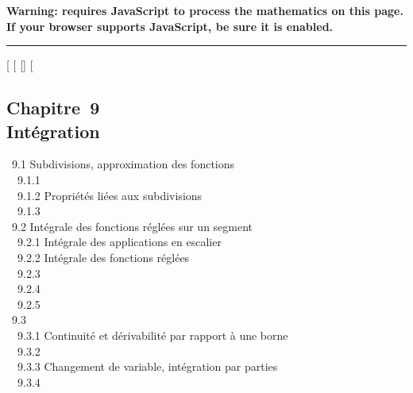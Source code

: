\textbf{Warning: 
requires JavaScript to process the mathematics on this page.\\ If your
browser supports JavaScript, be sure it is enabled.}

\begin{center}\rule{3in}{0.4pt}\end{center}

{[}
{[}
{[}{]}
{[}

\subsection{Chapitre~9\\Intégration}

~9.1 {Subdivisions, approximation
des fonctions} \\ ~~9.1.1
 \\
~~9.1.2 {Propriétés liées aux
subdivisions} \\ ~~9.1.3
 \\
~9.2 {Intégrale des fonctions
réglées sur un segment} \\ ~~9.2.1
{Intégrale des applications en
escalier} \\ ~~9.2.2 {Intégrale
des fonctions réglées} \\ ~~9.2.3
 \\ ~~9.2.4
 \\ ~~9.2.5
 \\ ~9.3
 \\
~~9.3.1 {Continuité et
dérivabilité par rapport à une borne} \\ ~~9.3.2
 \\ ~~9.3.3
{Changement de variable,
intégration par parties} \\ ~~9.3.4

